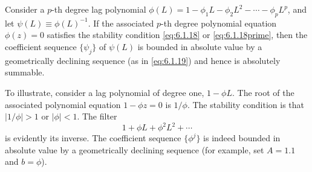 \begin{proposition}
\label{prop:6.3}
Consider a $p$-th degree lag polynomial $\phi(L) = 1 - \phi_1 L - \phi_2 L^2 - \cdots - \phi_p L^p$,
and let $\psi(L) \equiv \phi(L)^{-1}$. If the associated $p$-th degree polynomial equation
$\phi(z) = 0$ satisfies the stability condition \eqref{eq:6.1.18} or \eqref{eq:6.1.18prime}, then the coefficient
sequence $\{\psi_j\}$ of $\psi(L)$ is bounded in absolute value by a geometrically declining
sequence (as in \eqref{eq:6.1.19}) and hence is absolutely summable.
\end{proposition}

To illustrate, consider a lag polynomial of degree one, $1 - \phi L$. The root of the
associated polynomial equation $1 - \phi z = 0$ is $1/\phi$. The stability condition is that
$|1/\phi| > 1$ or $|\phi| < 1$. The filter
\begin{equation}
  1 + \phi L + \phi^2 L^2 + \cdots
  \label{eq:6.1.20}
\end{equation}
is evidently its inverse. The coefficient sequence $\{\phi^j\}$ is indeed bounded in absolute
value by a geometrically declining sequence (for example, set $A = 1.1$ and $b = \phi$).
